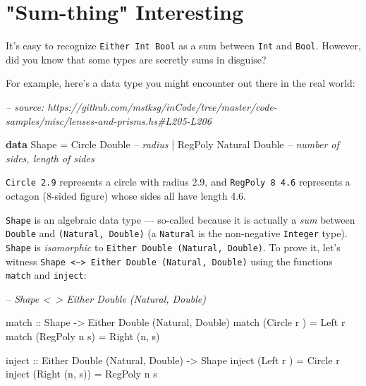 \documentclass[]{article}
\newenvironment{Shaded}{}{}
\newcommand{\CommentTok}[1]{\textcolor[rgb]{0.38,0.63,0.69}{\textit{#1}}}
\newcommand{\DataTypeTok}[1]{\textcolor[rgb]{0.56,0.13,0.00}{#1}}
\newcommand{\FunctionTok}[1]{\textcolor[rgb]{0.02,0.16,0.49}{#1}}
\newcommand{\KeywordTok}[1]{\textcolor[rgb]{0.00,0.44,0.13}{\textbf{#1}}}
\newcommand{\NormalTok}[1]{#1}
\newcommand{\OtherTok}[1]{\textcolor[rgb]{0.00,0.44,0.13}{#1}}
\begin{document}
\hypertarget{sum-thing-interesting}{%
\section{"Sum-thing" Interesting}\label{sum-thing-interesting}}

It's easy to recognize \texttt{Either\ Int\ Bool} as a sum between \texttt{Int}
and \texttt{Bool}. However, did you know that some types are secretly sums in
disguise?

For example, here's a data type you might encounter out there in the real world:

\begin{Shaded}
\begin{Highlighting}[]
\CommentTok{-- source: https://github.com/mstksg/inCode/tree/master/code-samples/misc/lenses-and-prisms.hs#L205-L206}

\KeywordTok{data} \DataTypeTok{Shape} \FunctionTok{=} \DataTypeTok{Circle}  \DataTypeTok{Double}           \CommentTok{-- radius}
           \FunctionTok{|} \DataTypeTok{RegPoly} \DataTypeTok{Natural} \DataTypeTok{Double}   \CommentTok{-- number of sides, length of sides}
\end{Highlighting}
\end{Shaded}

\texttt{Circle\ 2.9} represents a circle with radius 2.9, and
\texttt{RegPoly\ 8\ 4.6} represents a octagon (8-sided figure) whose sides all
have length 4.6.

\texttt{Shape} is an algebraic data type --- so-called because it is actually a
\emph{sum} between \texttt{Double} and \texttt{(Natural,\ Double)} (a
\texttt{Natural} is the non-negative \texttt{Integer} type). \texttt{Shape} is
\emph{isomorphic} to \texttt{Either\ Double\ (Natural,\ Double)}. To prove it,
let's witness
\texttt{Shape\ \textless{}\textasciitilde{}\textgreater{}\ Either\ Double\ (Natural,\ Double)}
using the functions \texttt{match} and \texttt{inject}:

\begin{Shaded}
\begin{Highlighting}[]
\CommentTok{-- Shape <~> Either Double (Natural, Double)}

\OtherTok{match ::} \DataTypeTok{Shape} \OtherTok{->} \DataTypeTok{Either} \DataTypeTok{Double}\NormalTok{ (}\DataTypeTok{Natural}\NormalTok{, }\DataTypeTok{Double}\NormalTok{)}
\NormalTok{match (}\DataTypeTok{Circle}\NormalTok{  r  ) }\FunctionTok{=} \DataTypeTok{Left}\NormalTok{ r}
\NormalTok{match (}\DataTypeTok{RegPoly}\NormalTok{ n s) }\FunctionTok{=} \DataTypeTok{Right}\NormalTok{ (n, s)}

\OtherTok{inject ::} \DataTypeTok{Either} \DataTypeTok{Double}\NormalTok{ (}\DataTypeTok{Natural}\NormalTok{, }\DataTypeTok{Double}\NormalTok{) }\OtherTok{->} \DataTypeTok{Shape}
\NormalTok{inject (}\DataTypeTok{Left}\NormalTok{   r    ) }\FunctionTok{=} \DataTypeTok{Circle}\NormalTok{  r}
\NormalTok{inject (}\DataTypeTok{Right}\NormalTok{ (n, s)) }\FunctionTok{=} \DataTypeTok{RegPoly}\NormalTok{ n s}
\end{Highlighting}
\end{Shaded}
\end{document}

